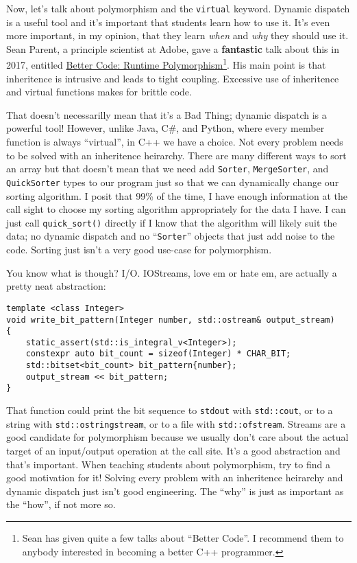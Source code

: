 \documentclass{article}
\begin{document}
Now, let's talk about polymorphism and the \lstinline{virtual} keyword.  Dynamic dispatch is a useful tool and it's important that students learn how to use it.  It's even more important, in my opinion, that they learn \emph{when} and \emph{why} they should use it.  Sean Parent, a principle scientist at Adobe, gave a \textbf{fantastic} talk about this in 2017, entitled \href{https://www.youtube.com/watch?v=QGcVXgEVMJg}{Better Code: Runtime Polymorphism}\footnote{Sean has given quite a few talks about ``Better Code''.  I recommend them to anybody interested in becoming a better C++ programmer.}.  His main point is that inheritence is intrusive and leads to tight coupling.  Excessive use of inheritence and virtual functions makes for brittle code.  

That doesn't necessarilly mean that it's a Bad Thing; dynamic dispatch is a powerful tool!  However, unlike Java, C\#, and Python, where every member function is always ``virtual'', in C++ we have a choice.  Not every problem needs to be solved with an inheritence heirarchy.  There are many different ways to sort an array but that doesn't mean that we need add \lstinline{Sorter}, \lstinline{MergeSorter}, and \lstinline{QuickSorter} types to our program just so that we can dynamically change our sorting algorithm.  I posit that 99\% of the time, I have enough information at the call sight to choose my sorting algorithm appropriately for the data I have.  I can just call \lstinline{quick_sort()} directly if I know that the algorithm will likely suit the data; no dynamic dispatch and no ``\lstinline{Sorter}'' objects that just add noise to the code.  Sorting just isn't a very good use-case for polymorphism.

You know what is though?  I/O.  IOStreams, love em or hate em, are actually a pretty neat abstraction: 
\begin{lstlisting}
template <class Integer>
void write_bit_pattern(Integer number, std::ostream& output_stream)
{
	static_assert(std::is_integral_v<Integer>);
	constexpr auto bit_count = sizeof(Integer) * CHAR_BIT;
	std::bitset<bit_count> bit_pattern{number};
	output_stream << bit_pattern; 
}
\end{lstlisting}

That function could print the bit sequence to \lstinline{stdout} with \lstinline{std::cout}, or to a string with \lstinline{std::ostringstream}, or to a file with \lstinline{std::ofstream}.  Streams are a good candidate for polymorphism because we usually don't care about the actual target of an input/output operation at the call site.  It's a good abstraction and that's important.  When teaching students about polymorphism, try to find a good motivation for it!  Solving every problem with an inheritence heirarchy and dynamic dispatch just isn't good engineering.  The ``why'' is just as important as the ``how'', if not more so.
\end{document}
